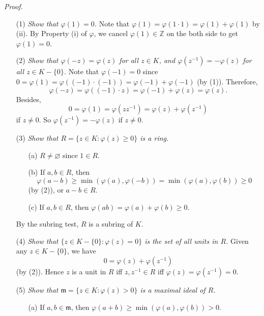 \documentclass{article}
\begin{document}
\emph{Proof.}
\begin{enumerate}
\item[(1)]
  \emph{Show that $\varphi(1) = 0$.}
  Note that $\varphi(1) = \varphi(1 \cdot 1) = \varphi(1) + \varphi(1)$ by (ii).
  By Property (i) of $\varphi$,
  we cancel $\varphi(1) \in \mathbb{Z}$ on the both side to get $\varphi(1) = 0$.

\item[(2)]
  \emph{Show that $\varphi(-z) = \varphi(z)$ for all $z \in K$,
  and $\varphi(z^{-1}) = -\varphi(z)$ for all $z \in K - \{0\}$.}
  Note that $\varphi(-1) = 0$
  since $0 = \varphi(1) = \varphi((-1) \cdot (-1)) = \varphi(-1) + \varphi(-1)$ (by (1)).
  Therefore,
  \[
    \varphi(-z) = \varphi((-1) \cdot z) = \varphi(-1) + \varphi(z) = \varphi(z).
  \]
  Besides,
  \[
    0 = \varphi(1) = \varphi(z z^{-1}) = \varphi(z) + \varphi(z^{-1})
  \]
  if $z \neq 0$. So $\varphi(z^{-1}) = -\varphi(z)$ if $z \neq 0$.

\item[(3)]
  \emph{Show that $R = \{z \in K : \varphi(z) \geq 0 \}$ is a ring.}
  \begin{enumerate}
  \item[(a)]
    $R \neq \varnothing$ since $1 \in R$.

  \item[(b)]
    If $a, b \in R$, then
    \[
      \varphi(a-b)
      \geq \min(\varphi(a), \varphi(-b))
      = \min(\varphi(a), \varphi(b))
      \geq 0
    \]
    (by (2)), or $a - b \in R$.

  \item[(c)]
    If $a, b \in R$, then $\varphi(ab) = \varphi(a) + \varphi(b) \geq 0$.
  \end{enumerate}
  By the subring test, $R$ is a subring of $K$.

\item[(4)]
  \emph{Show that $\{ z \in K - \{0\}: \varphi(z) = 0 \}$ is the set of all units in $R$.}
  Given any $z \in K - \{0\}$, we have
  \[
    0 = \varphi(z) + \varphi(z^{-1})
  \]
  (by (2)).
  Hence $z$ is a unit in $R$ iff
  $z, z^{-1} \in R$ iff $\varphi(z) = \varphi(z^{-1}) = 0$.

\item[(5)]
  \emph{Show that $\mathfrak{m} = \{ z \in K : \varphi(z) > 0 \}$ is a maximal ideal of $R$.}
  \begin{enumerate}
  \item[(a)]
    If $a, b \in \mathfrak{m}$, then $\varphi(a+b) \geq \min(\varphi(a), \varphi(b)) > 0$.


\end{enumerate}
\end{enumerate}
\end{document}
